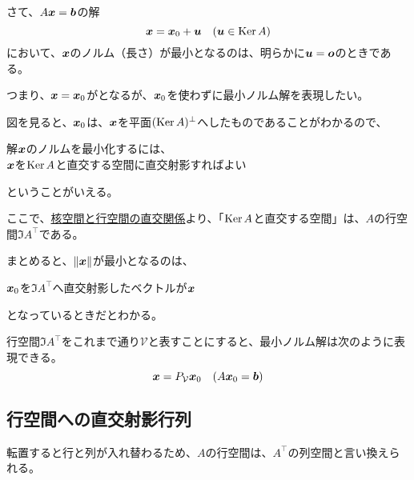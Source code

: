 \documentclass[../../../topic_linear-algebra]{subfiles}
\begin{document}
さて、$A\vb*{x} = \vb*{b}$の解
\begin{equation*}
  \vb*{x} = \vb*{x}_0 + \vb*{u} \quad (\vb*{u} \in \operatorname{Ker} A)
\end{equation*}
において、$\vb*{x}$のノルム（長さ）が最小となるのは、明らかに$\vb*{u} = \vb*{o}$のときである。

つまり、$\vb*{x} = \vb*{x}_0$がとなるが、$\vb*{x}_0$を使わずに最小ノルム解を表現したい。

\br

図を見ると、$\vb*{x}_0$は、$\vb*{x}$を平面$(\operatorname{Ker} A)^\perp$へしたものであることがわかるので、
\begin{emphabox}
  \begin{spacebox}
    \begin{center}
      解$\vb*{x}$のノルムを最小化するには、\\
      $\vb*{x}$を$\operatorname{Ker} A$と直交する空間に直交射影すればよい
    \end{center}
  \end{spacebox}
\end{emphabox}
ということがいえる。

\br

ここで、\hyperref[thm:kernel-row-orthogonality]{核空間と行空間の直交関係}より、「$\operatorname{Ker} A$と直交する空間」は、$A$の行空間$\Im A^\top$である。

\br

まとめると、$\| \vb*{x} \|$が最小となるのは、
\begin{spacebox}
  \begin{center}
    $\vb*{x}_0$を$\Im A^\top$へ直交射影したベクトルが$\vb*{x}$
  \end{center}
\end{spacebox}
となっているときだとわかる。

\br

行空間$\Im A^\top$をこれまで通り$\mathcal{V}$と表すことにすると、最小ノルム解は次のように表現できる。
\begin{equation*}
  \vb*{x} = P_{\mathcal{V}} \vb*{x}_0 \quad (A\vb*{x}_0 = \vb*{b})
\end{equation*}

\subsection{行空間への直交射影行列}

転置すると行と列が入れ替わるため、$A$の行空間は、$A^\top$の列空間と言い換えられる。
\end{document}
